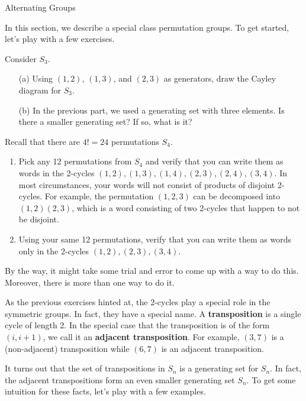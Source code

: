 \begin{section}{Alternating Groups}

In this section, we describe a special class permutation groups.  To get started, let's play with a few exercises.

\begin{exercise}
Consider $S_3$.
\begin{enumerate}
\item[(a)] Using $(1,2)$, $(1,3)$, and $(2,3)$ as generators, draw the Cayley diagram for $S_3$.
\item[(b)] In the previous part, we used a generating set with three elements.  Is there a smaller generating set?  If so, what is it?
\end{enumerate}
\end{exercise}

\begin{exercise}
Recall that there are $4!=24$ permutations $S_4$.    
\begin{enumerate}[label=\rm{(\alph*)}]
\item Pick any 12 permutations from $S_4$ and verify that you can write them as words in the 2-cycles $(1,2), (1,3), (1,4), (2,3), (2,4),(3,4)$.  In most circumstances, your words will not consist of products of disjoint 2-cycles.  For example, the permutation $(1,2,3)$ can be decomposed into $(1,2)(2,3)$, which is a word consisting of two 2-cycles that happen to not be disjoint.
\item Using your same 12 permutations, verify that you can write them as words only in the 2-cycles $(1,2),(2,3),(3,4)$.
\end{enumerate}
By the way, it might take some trial and error to come up with a way to do this.  Moreover, there is more than one way to do it.
\end{exercise}

As the previous exercises hinted at, the 2-cycles play a special role in the symmetric groups.  In fact, they have a special name.  A \textbf{transposition} is a single cycle of length 2.  In the special case that the transposition is of the form $(i,i+1)$, we call it an \textbf{adjacent transposition}.  For example, $(3,7)$ is a (non-adjacent) transposition while $(6,7)$ is an adjacent transposition.

It turns out that the set of transpositions in $S_n$ is a generating set for $S_n$.  In fact, the adjacent transpositions form an even smaller generating set $S_n$.  To get some intuition for these facts, let's play with a few examples.


\end{section}
